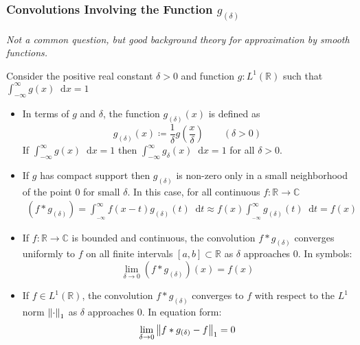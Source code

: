 \documentclass[11pt, a4paper]{article}
\newcommand{\question}[1]{\textit{#1}\vspace{2mm}}
\newcommand{\R}{\mathbb{R}} %
\newcommand{\C}{\mathbb{C}} %
\newcommand{\diff}{\mathop{}\!\mathrm{d}} %
\begin{document}
\subsubsection{Convolutions Involving the Function $ g_{(\delta)} $}
\question{Not a common question, but good background theory for approximation by smooth functions.}

Consider the positive real constant $ \delta > 0 $ and function $ g:L^1(\R) $ such that $ \displaystyle{\int_{-\infty}^{\infty}g(x) \diff x = 1} $
\begin{itemize}
	\item In terms of $ g $ and $ \delta $, the function $ g_{(\delta)}(x) $ is defined as
	\begin{equation*}
		g_{(\delta)}(x) \coloneqq \frac{1}{\delta} g\left(\frac{x}{\delta}\right) \qquad (\delta > 0)
	\end{equation*}
	If $ \displaystyle{\int_{-\infty}^{\infty}g(x) \diff x = 1} $ then $ \displaystyle{\int_{-\infty}^{\infty}g_{\delta}(x) \diff x = 1} $ for all $ \delta > 0 $.
	
	\item If $ g $ has compact support then $ g_{(\delta)} $ is non-zero only in a small neighborhood of the point $ 0 $ for small $ \delta $. In this case, for all continuous $ f:\R \to \C $
		\begin{align*}
			(f *g_{(\delta)}) = \int_{_{-\infty}}^{\infty}f(x-t)g_{(\delta)}(t) \diff t \approx f(x) \int_{_{-\infty}}^{\infty} g_{(\delta)}(t) \diff t = f(x)
		\end{align*}
		
	\item If $ f:\R \to \C $ is bounded and continuous, the convolution $ f*g_{(\delta)} $ converges uniformly to $ f $ on all finite intervals $ [a, b] \subset \R $ as $ \delta $ approaches $ 0 $. In symbols:
	\begin{equation*}
		\lim_{\delta \to 0}  ( f*g_{(\delta)})(x) = f(x)
	\end{equation*}
	
	\item If $ f \in L^1(\R) $, the convolution $ f*g_{(\delta)} $ converges to $ f $ with respect to the $ L^{1} $ norm $ \norm{\cdot}_{1} $ as $ \delta $ approaches $ 0 $. In equation form:
	\begin{equation*}
		\lim_{\delta \to 0} \norm{f*g_{(\delta)} - f}_{1}  = 0
	\end{equation*}

\end{itemize}
\end{document}
